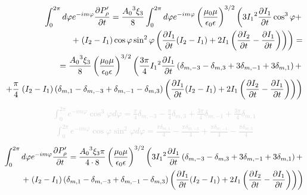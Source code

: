 %
\textcolor{lightgray} { \begin{equation*} \begin{aligned}
\int_{0}^{2 \pi} d \varphi e^{-im \varphi} \frac{\partial P_\rho^\prime}{\partial t} = 
\frac{ {A_0}^3 \xi_3 }{ 8 } \int_{0}^{2\pi} d \varphi
e^{-im\varphi} \left( \frac{\mu_0 \mu} {\epsilon_0 \epsilon} \right)^{3/2} 
\left( 3 {I_1}^2 \frac{\partial I_1}{\partial t} \cos^3 \varphi + \right. \\
+ \left. ( I_2 - I_1 ) \cos \varphi \sin^2 \varphi \left( 
\frac{\partial I_1}{\partial t} ( I_2 - I_1 ) + 2 I_1 \left( \frac{\partial I_2}{\partial t} - 
\frac{\partial I_1}{\partial t} \right) \right) \right) = \\
= \frac{ {A_0}^3 \xi_3 }{ 8 } 
\left( \frac{\mu_0 \mu} {\epsilon_0 \epsilon} \right)^{3/2}
\left( \frac{3 \pi}{4} {I_1}^2 \frac{\partial I_1}{\partial t} \left( \delta_{m,-3} - 
\delta_{m,3} + 3 \delta_{m,-1} + 3 \delta_{m,1} \right) + \right. \\
+ \frac{\pi }{4} \left. ( I_2 - I_1 ) \left( \delta_{m,1} - 
\delta_{m,-3} + \delta_{m,-1} - \delta_{m,3} \right) \left( 
\frac{\partial I_1}{\partial t} ( I_2 - I_1 ) + 2 I_1 \left( \frac{\partial I_2}{\partial t} - 
\frac{\partial I_1}{\partial t} \right) \right) \right)
\end{aligned} \end{equation*} }
%
\textcolor{lightgray} { \begin{equation*} \begin{aligned}
\int_{0}^{2\pi} e^{-i m \varphi} \cos^3 \varphi d \varphi = 
\frac{\pi}{4} \delta_{m,-3} - \frac{\pi}{4} \delta_{m,3} + 
\frac{3 \pi}{4} \delta_{m,-1} + \frac{3 \pi}{4} \delta_{m,1}
\end{aligned} \end{equation*} }
%
\textcolor{lightgray} { \begin{equation*} \begin{aligned}
\int_{0}^{2\pi} e^{-i m \varphi} \cos \varphi \sin^2 \varphi d \varphi = 
\frac{\pi \delta_{m,1} }{4} - \frac{\pi \delta_{m,-3} }{4} + 
\frac{\pi \delta_{m,-1} }{4} - \frac{\pi \delta_{m,3} }{4}
\end{aligned} \end{equation*} }
%
\begin{equation*} \begin{aligned}
\int_{0}^{2\pi} d \varphi e^{-im \varphi} \frac{\partial P_\rho^\prime}{\partial t} = 
\frac{ {A_0}^3 \xi_3 \pi }{ 4 \cdot 8 } 
\left( \frac{\mu_0 \mu} {\epsilon_0 \epsilon} \right)^{3/2}
\left( 3 {I_1}^2 \frac{\partial I_1}{\partial t} \left( \delta_{m,-3} - 
\delta_{m,3} + 3 \delta_{m,-1} + 3 \delta_{m,1} \right) + \right. \\
+ \left. ( I_2 - I_1 ) \left( \delta_{m,1} - 
\delta_{m,-3} + \delta_{m,-1} - \delta_{m,3} \right) \left( 
\frac{\partial I_1}{\partial t} ( I_2 - I_1 ) + 2 I_1 \left( \frac{\partial I_2}{\partial t} - 
\frac{\partial I_1}{\partial t} \right) \right) \right)
\end{aligned} \end{equation*}
